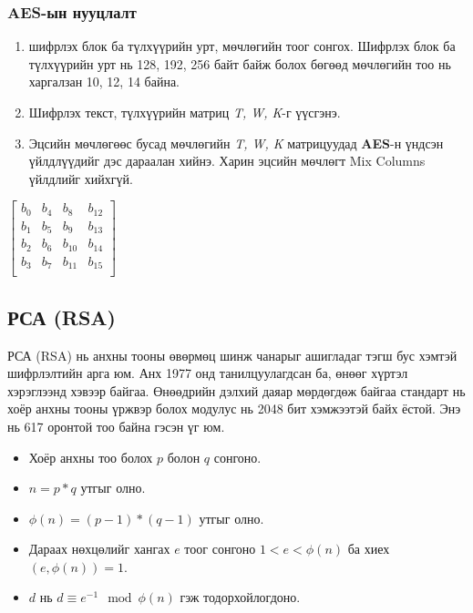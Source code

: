 	\subsubsection{AES-ын нууцлалт}
	\begin{enumerate}
		\item шифрлэх блок ба түлхүүрийн урт, мөчлөгийн тоог сонгох. Шифрлэх блок ба түлхүүрийн урт нь 128, 192, 256 байт байж болох бөгөөд мөчлөгийн тоо нь харгалзан 10, 12, 14 байна.
		\item Шифрлэх текст, түлхүүрийн матриц \textit{T, W, K}-г үүсгэнэ.
		\item Эцсийн мөчлөгөөс бусад мөчлөгийн \textit{T, W, K} матрицуудад \textbf{AES}-н үндсэн үйлдлүүдийг дэс дараалан хийнэ. Харин эцсийн мөчлөгт Mix Columns үйлдлийг хийхгүй.
	\end{enumerate}
	\begin{center}
		$\begin{bmatrix}
				b_{0} & b_{4} & b_{8}  & b_{12} \\
				b_{1} & b_{5} & b_{9}  & b_{13} \\
				b_{2} & b_{6} & b_{10} & b_{14} \\
				b_{3} & b_{7} & b_{11} & b_{15} \\
			\end{bmatrix}$
	\end{center}
	\subsection{РСА (RSA)}
	РСА (RSA) нь анхны тооны өвөрмөц шинж чанарыг ашигладаг тэгш бус хэмтэй шифрлэлтийн арга юм. Анх 1977 онд танилцуулагдсан ба, өнөөг хүртэл хэрэглээнд хэвээр байгаа. Өнөөдрийн дэлхий даяар мөрдөгдөж байгаа стандарт нь хоёр анхны тооны үржвэр болох модулус нь 2048 бит хэмжээтэй байх ёстой. Энэ нь 617 оронтой тоо байна гэсэн үг юм.
	\begin{itemize}
		\item Хоёр анхны тоо болох $p$ болон $q$ сонгоно.
		\item $n = p*q$ утгыг олно.
		\item $\phi(n) = (p-1)*(q-1)$ утгыг олно.
		\item Дараах нөхцөлийг хангах $e$ тоог сонгоно $1 < e < \phi(n)$ ба хиех$(e, \phi(n)) = 1$.
		\item $d$ нь $d \equiv e^{-1} \mod \phi(n)$ гэж тодорхойлогдоно.
	\end{itemize}

